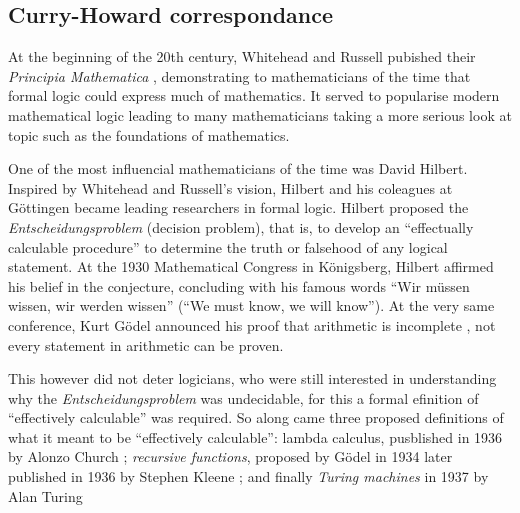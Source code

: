 \subsection{Curry-Howard correspondance}

At the beginning of the 20th century, Whitehead and Russell pubished their \emph{Principia Mathematica} \cite{GlossarWiki:Whitehead_Russell:1910}, demonstrating to mathematicians of the time that formal logic could express much of mathematics. It served to popularise modern mathematical logic leading to many mathematicians taking a more serious look at topic such as the foundations of mathematics.

One of the most influencial mathematicians of the time was David Hilbert. Inspired by Whitehead and Russell's vision, Hilbert and his coleagues at G\"ottingen became leading researchers in formal logic. Hilbert proposed the \emph{Entscheidungsproblem} (decision problem), that is, to develop an ``effectually calculable procedure'' to determine the truth or falsehood of any logical statement. At the 1930 Mathematical Congress in K\"onigsberg, Hilbert affirmed his belief in the conjecture, concluding with his famous words ``Wir m\"ussen wissen, wir werden wissen'' (``We must know, we will know''). At the very same conference, Kurt G\"odel announced his proof that arithmetic is incomplete \cite{GlossarWiki:Goedel:1931}, not every statement in arithmetic can be proven.

This however did not deter logicians, who were still interested in understanding why the \emph{Entscheidungsproblem} was undecidable, for this a formal efinition of ``effectively calculable'' was required. So along came three proposed definitions of what it meant to be ``effectively calculable'': lambda calculus, pusblished in 1936 by Alonzo Church \cite{church-unsolvableproblemof-1936}; \emph{recursive functions}, proposed by G\"odel in 1934 later published in 1936 by Stephen Kleene \cite{Kleene1936}; and finally \emph{Turing machines} in 1937 by Alan Turing \cite{turing1936a}







